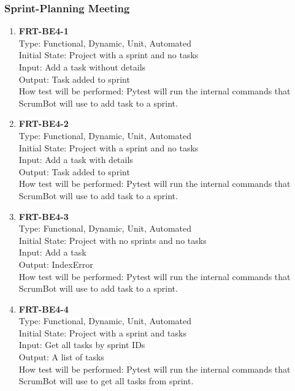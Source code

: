 \documentclass[12pt, titlepage]{article}
\begin{document}
\subsubsection{Sprint-Planning Meeting}
\begin{enumerate}
    \item{\textbf{FRT-BE4-1}}\\
    Type: Functional, Dynamic, Unit, Automated\\
    Initial State: Project with a sprint and no tasks\\
    Input: Add a task without details\\
    Output: Task added to sprint\\
    How test will be performed: Pytest will run the internal commands that ScrumBot will use to add task to a sprint.

    \item{\textbf{FRT-BE4-2}}\\
    Type: Functional, Dynamic, Unit, Automated\\
    Initial State: Project with a sprint and no tasks\\
    Input: Add a task with details\\
    Output: Task added to sprint\\
    How test will be performed: Pytest will run the internal commands that ScrumBot will use to add task to a sprint.
    
    \item{\textbf{FRT-BE4-3}}\\
    Type: Functional, Dynamic, Unit, Automated\\
    Initial State: Project with no sprints and no tasks \\
    Input: Add a task\\
    Output: IndexError\\
    How test will be performed: Pytest will run the internal commands that ScrumBot will use to add task to a sprint.
    
    \item{\textbf{FRT-BE4-4}}\\
    Type: Functional, Dynamic, Unit, Automated\\
    Initial State: Project with a sprint and tasks \\
    Input: Get all tasks by sprint IDs\\
    Output: A list of tasks\\
    How test will be performed: Pytest will run the internal commands that ScrumBot will use to get all tasks from sprint.
    

\end{enumerate}
\end{document}
